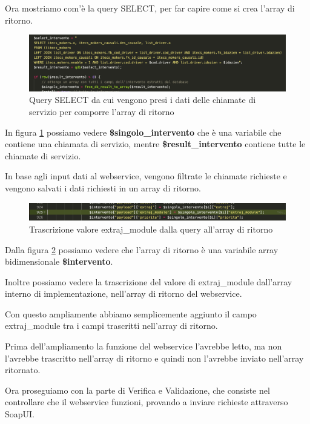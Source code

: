 \newpage

\newspace
\begin{flushleft}
	Ora mostriamo com'è la query SELECT, per far capire come si crea l'array di ritorno.
\end{flushleft}

\begin{figure}[!h] 
	\centering
	\includegraphics[scale = 0.4]{immagini/webservices/ampliamenti/3ampl__nontoccata_query_select.png}
	\caption{Query SELECT da cui vengono presi i dati delle chiamate di servizio per comporre l'array di ritorno}
	\label{fig:5-9}
\end{figure}
\newspace
In figura \ref{fig:5-9} possiamo vedere \textbf{\$singolo\_intervento} che è una variabile che contiene una chiamata di servizio, mentre \textbf{\$result\_intervento} contiene tutte le chiamate di servizio.

In base agli input dati al webservice, vengono filtrate le chiamate richieste e vengono salvati i dati richiesti in un array di ritorno.
\newspace
\begin{figure}[!h] 
	\centering
	\includegraphics[scale = 0.5]{immagini/webservices/ampliamenti/3ampl__correzione_functionmokers.png}
	\caption{Trascrizione valore extraj\_module dalla query all'array di ritorno}
	\label{fig:5-10}
\end{figure}
\newspace

\begin{flushleft}
	Dalla figura \ref{fig:5-10} possiamo vedere che l'array di ritorno è una variabile array bidimensionale \textbf{\$intervento}.
	\newspace
	
	Inoltre possiamo vedere la trascrizione del valore di extraj\_module dall'array interno di implementazione, nell'array di ritorno del webservice.
	
	Con questo ampliamente abbiamo semplicemente aggiunto il campo extraj\_module tra i campi trascritti nell'array di ritorno.
	
	Prima dell'ampliamento la funzione del webservice l'avrebbe letto, ma non l'avrebbe trascritto nell'array di ritorno e quindi non l'avrebbe inviato nell'array ritornato.
	\newspace
	
	Ora proseguiamo con la parte di Verifica e Validazione, che consiste nel controllare che il webservice funzioni, provando a inviare richieste attraverso SoapUI.
\end{flushleft}
\newspace

